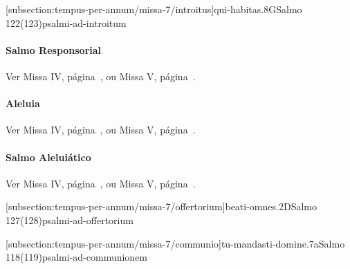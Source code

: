 \def\Prefix{subsection:tempus-per-annum/missa-7}

[\Prefix/introitus]{qui-habitas.8G}{Salmo 122(123)}{psalmi-ad-introitum}

\paragraph{Salmo Responsorial}
\begin{rubrica}
  Ver Missa IV, página~\pageref{subsection:tempus-per-annum/missa-4/psalmus-responsorius}, ou Missa V, página~\pageref{subsection:tempus-per-annum/missa-5/psalmus-responsorius}.
\end{rubrica}

\paragraph{Aleluia}
\begin{rubrica}
  Ver Missa IV, página~\pageref{subsection:tempus-per-annum/missa-4/alleluia}, ou Missa V, página~\pageref{subsection:tempus-per-annum/missa-5/alleluia}.
\end{rubrica}

\paragraph{Salmo Aleluiático}
\begin{rubrica}
  Ver Missa IV, página~\pageref{subsection:tempus-per-annum/missa-4/psalmus-alleluiaticus}, ou Missa V, página~\pageref{subsection:tempus-per-annum/missa-5/psalmus-alleluiaticus}.
\end{rubrica}

\AllowPageFlush

[\Prefix/offertorium]{beati-omnes.2D}{Salmo 127(128)}{psalmi-ad-offertorium}

\AllowPageFlush

[\Prefix/communio]{tu-mandasti-domine.7a}{Salmo 118(119)}{psalmi-ad-communionem}